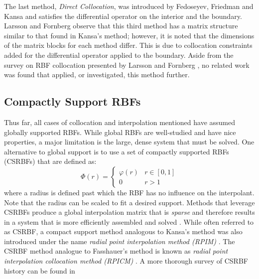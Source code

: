 \documentclass{report}
\begin{document}
{The last method, \emph{Direct Collocation}, was introduced by Fedoseyev, Friedman and Kansa
 \cite{Fedoseyev2002} and satisfies the differential operator on the interior and the boundary. Larsson and Fornberg \cite{Larsson2003} observe that this third method has a matrix structure similar to that found in Kansa's method; however, it is noted that the dimensions of the matrix blocks for each method differ. This is due to collocation constraints added for 
the differential operator applied to the boundary. Aside from the survey on RBF collocation presented by Larsson and Fornberg \cite{Larsson2003}, no related 
work was found that applied, or investigated, this method further. 



%


\subsection{Compactly Support RBFs} 

Thus far, all cases of collocation and interpolation mentioned have assumed globally supported RBFs. While global RBFs are well-studied and have nice properties, a major limitation is the large, dense system that must be solved. One alternative to global support is to use a set of compactly supported RBFs (CSRBFs) that are defined as: 
\begin{equation}
\Phi(r) = \begin{cases} \varphi(r) & r \in [0,1]\\
0 & r > 1
\end{cases}
\label{eqn:csrbf}
\end{equation}
where a radius is defined past which the RBF has no influence on the interpolant. Note that the radius can be scaled to fit a desired support. Methods that leverage CSRBFs produce a global interpolation matrix that is \emph{sparse} and therefore results in a system that is more efficiently assembled and solved \cite{Fasshauer2007}. While often referred to as CSRBF, a compact support method analogous to Kansa's method was also introduced under the name \emph{radial point interpolation method (RPIM)} \cite{Wang2002}. The CSRBF method analogue to Fasshauer's method is known as \emph{radial point interpolation collocation method (RPICM)} \cite{Liu2005}. A more thorough survey of CSRBF history can be found in \cite{Fasshauer2007}

}
\end{document}
